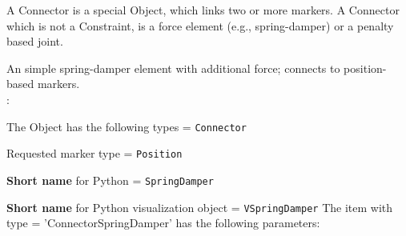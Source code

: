 \ei

%

\newpage
A Connector is a special Object, which links two or more markers. A Connector which is not a Constraint, is a force element (e.g., spring-damper) or a penalty based joint.


\label{sec:item:ObjectConnectorSpringDamper}
An simple spring-damper element with additional force; connects to position-based markers.
\vspace{12pt}\\

\noindent {}:
\bi
  \item The Object has the following types = \texttt{Connector}
  \item Requested marker type = \texttt{Position}
  \item {\bf Short name} for Python = \texttt{SpringDamper}
  \item {\bf Short name} for Python visualization object = \texttt{VSpringDamper}
\ei\vspace{12pt} \noindent 
The item  with type = 'ConnectorSpringDamper' has the following parameters:
\vspace{-0.5cm}\\
\vspace{-0.5cm}\\
